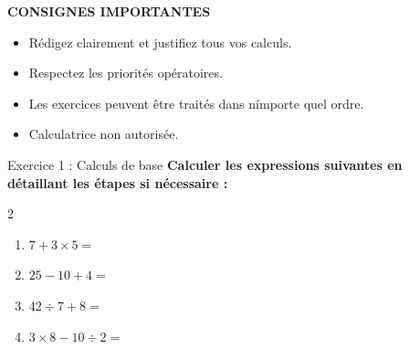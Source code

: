
\begin{center}
	 \quad
	 \quad
	 \quad
\end{center}

\vspace{0.3cm}

\begin{consignebox}
	 \textbf{CONSIGNES IMPORTANTES}
	\begin{itemize}[leftmargin=*,noitemsep,topsep=5pt]
		\item[\faIcon{check}] Rédigez clairement et justifiez tous vos calculs.
		\item[\faIcon{check}] Respectez les priorités opératoires.
		\item[\faIcon{check}] Les exercices peuvent être traités dans n\'importe quel ordre.
		\item[\faIcon{times}] Calculatrice non autorisée.
	\end{itemize}
\end{consignebox}

\vspace{0.5cm}

\begin{exercisebox}{ Exercice 1 : Calculs de base }
	\textbf{Calculer les expressions suivantes en détaillant les étapes si nécessaire :}
	\begin{multicols}{2}
		\begin{enumerate}[label=\textcolor{primary}{\textbf{\alph*)}},leftmargin=*]
            \item $7 + 3 \times 5 = $  
			\vspace{0.8cm}
			
            \item $25 - 10 + 4 = $  
			\vspace{0.8cm}
			
            \item $42 \div 7 + 8 = $  
			\vspace{0.8cm}
			
            \item $3 \times 8 - 10 \div 2 = $  
		\end{enumerate}
	\end{multicols}
\end{exercisebox}

